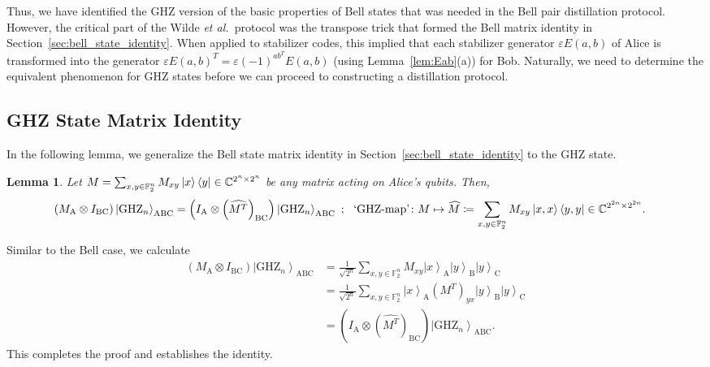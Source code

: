 \documentclass[journal,onecolumn]{IEEEtran}
\newtheorem{lemma}[theorem]{Lemma}
\newcommand{\ghzmap}[1]{\widehat{#1}}
\newcommand{\dket}[1]{\left\lvert #1 \right\rangle}
\newcommand{\etal}{\emph{et al.~}}
\begin{document}
Thus, we have identified the GHZ version of the basic properties of Bell states that was needed in the Bell pair distillation protocol.
However, the critical part of the Wilde \etal protocol was the transpose trick that formed the Bell matrix identity in Section~\ref{sec:bell_state_identity}.
When applied to stabilizer codes, this implied that each stabilizer generator $\varepsilon E(a,b)$ of Alice is transformed into the generator $\varepsilon E(a,b)^T = \varepsilon (-1)^{ab^T} E(a,b)$ (using Lemma~\ref{lem:Eab}(a)) for Bob.
Naturally, we need to determine the equivalent phenomenon for GHZ states before we can proceed to constructing a distillation protocol.


\subsection{GHZ State Matrix Identity}
\label{sec:ghz_state_identity}

In the following lemma, we generalize the Bell state matrix identity in Section~\ref{sec:bell_state_identity} to the GHZ state.

\begin{lemma}
\label{lem:ghz_state_identity}
Let $M = \sum_{x,y \in \mathbb{F}_2^n} M_{xy} \dketbra{x}{y} \in \mathbb{C}^{2^n \times 2^n}$ be any matrix acting on Alice's qubits.
Then, 
\begin{align*}
(M_{\text{A}} \otimes I_{\text{BC}}) \dket{\text{GHZ}_n}_{\text{ABC}} &= \left( I_{\text{A}} \otimes \left(\ghzmap{M^T}\right)_{\text{BC}} \right) \dket{\text{GHZ}_n}_{\text{ABC}} \ ; \ \ 
\text{`GHZ-map'} \colon M \mapsto \ghzmap{M} \coloneqq \sum_{x,y \in \mathbb{F}_2^n} M_{xy} \dketbra{x,x}{y,y} \in \mathbb{C}^{2^{2n} \times 2^{2n}}.
\end{align*}
\end{lemma}
\begin{IEEEproof}
Similar to the Bell case, we calculate
\begin{align}
(M_{\text{A}} \otimes I_{\text{BC}}) \dket{\text{GHZ}_n}_{\text{ABC}} & = \frac{1}{\sqrt{2^n}} \sum_{x,y \in \mathbb{F}_2^n} M_{xy} \dket{x}_{\text{A}} \dket{y}_{\text{B}} \dket{y}_{\text{C}} \\
%
  & = \frac{1}{\sqrt{2^n}} \sum_{x,y \in \mathbb{F}_2^n} \dket{x}_{\text{A}} (M^T)_{yx} \dket{y}_{\text{B}} \dket{y}_{\text{C}} \\
%
  & = \left( I_{\text{A}} \otimes \left(\ghzmap{M^T}\right)_{\text{BC}} \right) \dket{\text{GHZ}_n}_{\text{ABC}}.
\end{align}
This completes the proof and establishes the identity.
\end{IEEEproof}
\end{document}
